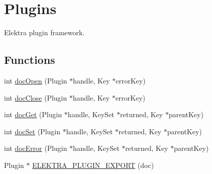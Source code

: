 \hypertarget{group__plugin}{\section{Plugins}
\label{group__plugin}
}


Elektra plugin framework.  


\subsection*{Functions}
\begin{DoxyCompactItemize}
\item 
int \hyperlink{group__plugin_ga1a72ac76b618943677e00ed7ab50b372}{doc\-Open} (Plugin $\ast$handle, Key $\ast$error\-Key)
\item 
int \hyperlink{group__plugin_gaed8aeda2b2beab1b8052f8a64c601754}{doc\-Close} (Plugin $\ast$handle, Key $\ast$error\-Key)
\item 
int \hyperlink{group__plugin_ga2f14a12b205687a31e6fd0645470ec69}{doc\-Get} (Plugin $\ast$handle, Key\-Set $\ast$returned, Key $\ast$parent\-Key)
\item 
int \hyperlink{group__plugin_ga01dd4018e48c3a091cb03940a7a8341f}{doc\-Set} (Plugin $\ast$handle, Key\-Set $\ast$returned, Key $\ast$parent\-Key)
\item 
int \hyperlink{group__plugin_gab0f8a88ee9868fb698b4e3040a70e000}{doc\-Error} (Plugin $\ast$handle, Key\-Set $\ast$returned, Key $\ast$parent\-Key)
\item 
Plugin $\ast$ \hyperlink{group__plugin_gabe78724d2d477eef39997fd9b85bff16}{E\-L\-E\-K\-T\-R\-A\-\_\-\-P\-L\-U\-G\-I\-N\-\_\-\-E\-X\-P\-O\-R\-T} (doc)
\end{DoxyCompactItemize}


